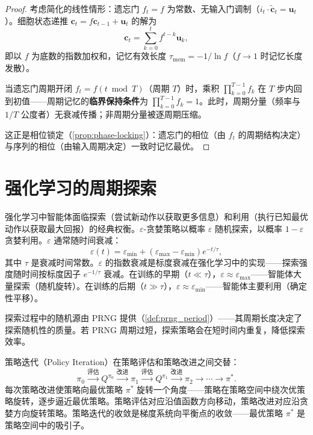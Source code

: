 \begin{proof}
考虑简化的线性情形：遗忘门 $f_t = f$ 为常数、无输入门调制（$i_t \cdot \tilde{\mathbf{c}}_t = \mathbf{u}_t$）。细胞状态递推 $\mathbf{c}_t = f \mathbf{c}_{t-1} + \mathbf{u}_t$ 的解为
\[
\mathbf{c}_t = \sum_{k=0}^{t} f^{t-k} \mathbf{u}_k,
\]
即以 $f$ 为底数的指数加权和，记忆有效长度 $\tau_{\text{mem}} = -1/\ln f$（$f \to 1$ 时记忆长度发散）。

当遗忘门周期开闭 $f_t = f(t \bmod T)$（周期 $T$）时，乘积 $\prod_{k=0}^{T-1} f_k$ 在 $T$ 步内回到初值——周期记忆的\textbf{临界保持条件}为 $\prod_{k=0}^{T-1} f_k = 1$。此时，周期分量（频率与 $1/T$ 公度者）无衰减传播；非周期分量被逐周期压缩。

这正是相位锁定（\cref{prop:phase-locking}）：遗忘门的相位（由 $f_t$ 的周期结构决定）与序列的相位（由输入周期决定）一致时记忆最优。
\end{proof}

\section{强化学习的周期探索}

\begin{definition}[探索-利用的周期交替]\label{def:exploration_exploitation}
强化学习中智能体面临探索（尝试新动作以获取更多信息）和利用（执行已知最优动作以获取最大回报）的经典权衡。$\varepsilon$-贪婪策略以概率 $\varepsilon$ 随机探索，以概率 $1-\varepsilon$ 贪婪利用。$\varepsilon$ 通常随时间衰减：
\[
\varepsilon(t) = \varepsilon_{\min} + (\varepsilon_{\max} - \varepsilon_{\min}) e^{-t/\tau},
\]
其中 $\tau$ 是衰减时间常数。$\varepsilon$ 的指数衰减是标度衰减在强化学习中的实现——探索强度随时间按标度因子 $e^{-1/\tau}$ 衰减。在训练的早期（$t \ll \tau$），$\varepsilon \approx \varepsilon_{\max}$——智能体大量探索（随机旋转）。在训练的后期（$t \gg \tau$），$\varepsilon \approx \varepsilon_{\min}$——智能体主要利用（确定性平移）。

探索过程中的随机源由 PRNG 提供（\cref{def:prng_period}）——其周期长度决定了探索随机性的质量。若 PRNG 周期过短，探索策略会在短时间内重复，降低探索效率。
\end{definition}

\begin{proposition}[策略迭代的周期收敛]\label{prop:policy_iteration_cycle}
策略迭代（Policy Iteration）在策略评估和策略改进之间交替：
\[
\pi_0 \xrightarrow{\text{评估}} Q^{\pi_0} \xrightarrow{\text{改进}} \pi_1 \xrightarrow{\text{评估}} Q^{\pi_1} \xrightarrow{\text{改进}} \pi_2 \to \cdots \to \pi^*.
\]
每次策略改进使策略向最优策略 $\pi^*$ 旋转一个角度——策略在策略空间中绕次优策略旋转，逐步逼近最优策略。策略评估对应沿值函数方向移动，策略改进对应沿贪婪方向旋转策略。策略迭代的收敛是梯度系统向平衡点的收敛——最优策略 $\pi^*$ 是策略空间中的吸引子。
\end{proposition}

